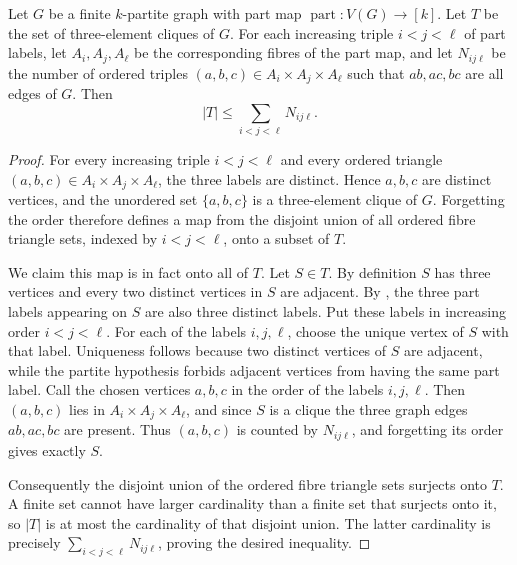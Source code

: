 \begin{helper}
Let $G$ be a finite $k$-partite graph with part map
$\operatorname{part}:V(G)\to [k]$.  Let $T$ be the set of three-element
cliques of $G$.  For each increasing triple $i<j<\ell$ of part labels, let
$A_i,A_j,A_\ell$ be the corresponding fibres of the part map, and let
$N_{ij\ell}$ be the number of ordered triples
$(a,b,c)\in A_i\times A_j\times A_\ell$ such that $ab,ac,bc$ are all
edges of $G$.  Then
\[
|T|\le \sum_{i<j<\ell} N_{ij\ell}.
\]
\end{helper}
\begin{proof}
For every increasing triple $i<j<\ell$ and every ordered triangle
$(a,b,c)\in A_i\times A_j\times A_\ell$, the three labels are distinct.
Hence $a,b,c$ are distinct vertices, and the unordered set
$\{a,b,c\}$ is a three-element clique of $G$.  Forgetting the order
therefore defines a map from the disjoint union of all ordered fibre
triangle sets, indexed by $i<j<\ell$, onto a subset of $T$.

We claim this map is in fact onto all of $T$.  Let $S\in T$.  By definition
$S$ has three vertices and every two distinct vertices in $S$ are adjacent.
By , the three part labels appearing
on $S$ are also three distinct labels.  Put these labels in increasing order
$i<j<\ell$.  For each of the labels $i,j,\ell$, choose the unique vertex of
$S$ with that label.  Uniqueness follows because two distinct vertices of
$S$ are adjacent, while the partite hypothesis forbids adjacent vertices
from having the same part label.  Call the chosen vertices $a,b,c$ in the
order of the labels $i,j,\ell$.  Then $(a,b,c)$ lies in
$A_i\times A_j\times A_\ell$, and since $S$ is a clique the three graph
edges $ab,ac,bc$ are present.  Thus $(a,b,c)$ is counted by
$N_{ij\ell}$, and forgetting its order gives exactly $S$.

Consequently the disjoint union of the ordered fibre triangle sets
surjects onto $T$.  A finite set cannot have larger cardinality than a
finite set that surjects onto it, so $|T|$ is at most the cardinality of
that disjoint union.  The latter cardinality is precisely
$\sum_{i<j<\ell}N_{ij\ell}$, proving the desired inequality.
\end{proof}
